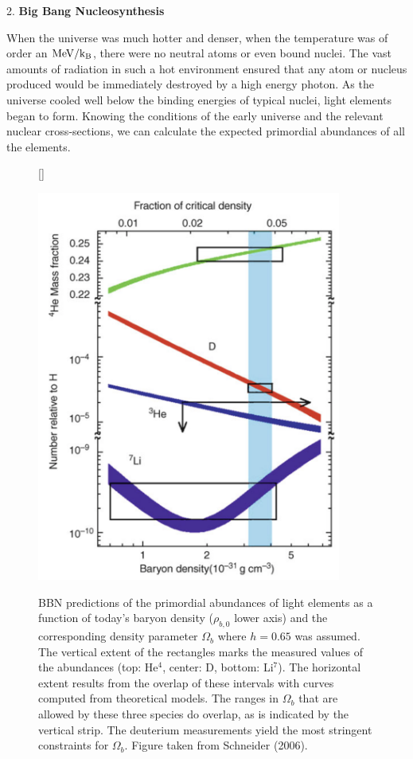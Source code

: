 \documentclass[a4paper,11pt]{article}
\begin{document}
{\noindent}2. \textbf{Big Bang Nucleosynthesis}

{\noindent}When the universe was much hotter and denser, when the temperature was of order an ${\rm MeV/k_B}$, there were no neutral atoms or even bound nuclei. The vast amounts of radiation in such a hot environment ensured that any atom or nucleus produced would be immediately destroyed by a high energy photon. As the universe cooled well below the binding energies of typical nuclei, light elements began to form. Knowing the conditions of the early universe and the relevant nuclear cross-sections, we can calculate the expected primordial abundances of all the elements.

\begin{figure}[h]
    [\FBwidth]
    {\caption{\footnotesize{BBN predictions of the primordial abundances of light elements as a function of today’s baryon density ($\rho_{b,0}$ lower axis) and the corresponding density parameter $\Omega_b$ where $h=0.65$ was assumed. The vertical extent of the rectangles marks the measured values of the abundances (top: He$^4$, center: D, bottom: Li$^7$). The horizontal extent results from the overlap of these intervals with curves computed from theoretical models. The ranges in $\Omega_b$ that are allowed by these three species do overlap, as is indicated by the vertical strip. The deuterium measurements yield the most stringent constraints for $\Omega_b$. Figure taken from Schneider (2006).}}
    \label{fig:bbn_prediction}}
    {\includegraphics[width=10cm]{figures/BBN_prediction.png}}
\end{figure}
\end{document}
